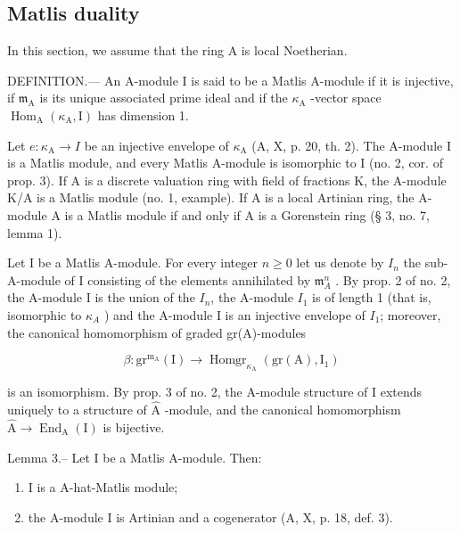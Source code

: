 \subsection{Matlis duality}

In this section, we assume that the ring A is local Noetherian.

DEFINITION.--- An A-module I is said to be a Matlis A-module if it is injective, if \(\mathfrak{m}_{\mathrm{A}}\) is its unique associated prime ideal and if the \(\kappa_{\mathrm{A}}\) -vector space \(\operatorname{Hom}_{\mathrm{A}}(\kappa_{\mathrm{A}}, \mathrm{I})\) has dimension 1.

Let \(e: \kappa_{\mathrm{A}} \to I\) be an injective envelope of \(\kappa_{\mathrm{A}}\) (A, X, p. 20, th. 2). The A-module I is a Matlis module, and every Matlis A-module is isomorphic to I (no. 2, cor. of prop. 3). If A is a discrete valuation ring with field of fractions K, the A-module K/A is a Matlis module (no. 1, example). If A is a local Artinian ring, the A-module A is a Matlis module if and only if A is a Gorenstein ring (§ 3, no. 7, lemma 1).

Let I be a Matlis A-module. For every integer \(n \geqslant 0\) let us denote by \(I_n\) the sub-A-module of I consisting of the elements annihilated by \(\mathfrak{m}_A^n\) . By prop. 2 of no. 2, the A-module I is the union of the \(I_n\), the A-module \(I_1\) is of length 1 (that is, isomorphic to \(\kappa_A\) ) and the A-module I is an injective envelope of \(I_1\); moreover, the canonical homomorphism of graded gr(A)-modules

\[
\beta : \mathrm{gr} ^ {\mathrm{m} _ {\mathrm{A}}} (\mathrm{I}) \longrightarrow \operatorname{Homgr} _ {\kappa_ {\mathrm{A}}} (\mathrm{gr} (\mathrm{A}), \mathrm{I} _ {1})\tag{3}
\]

is an isomorphism. By prop. 3 of no. 2, the A-module structure of I extends uniquely to a structure of \(\widehat{\mathrm{A}}\) -module, and the canonical homomorphism \(\widehat{\mathrm{A}} \to \operatorname{End}_{\mathrm{A}}(\mathrm{I})\) is bijective.

Lemma 3.-- Let I be a Matlis A-module. Then:

\begin{enumerate}
\def\labelenumi{\alph{enumi})}
\item
  I is a A-hat-Matlis module;
\item
  the A-module I is Artinian and a cogenerator (A, X, p. 18, def. 3).
\end{enumerate}

